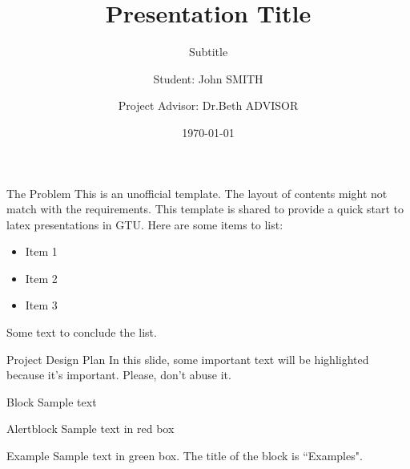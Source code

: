 \documentclass[aspectratio=169,xcolor=dvipsnames]{beamer}
\title[Title]
{
	Presentation Title
}
\subtitle{Subtitle}
\author[GTU]{Student: John SMITH  \and
	 Project Advisor: Dr.Beth ADVISOR }
\date{\today} %
\begin{document}
\begin{frame}
    \titlepage
\end{frame}





\begin{frame}{The Problem}
	This is an unofficial template. The layout of contents might not match with the requirements. This template is shared to provide a quick start to latex presentations in GTU. Here are some items to list:\\
	\vspace{0.03\textheight} %
	\begin{itemize}
		\item Item 1
		\item Item 2
		\item Item 3
	\end{itemize}
	\vspace{0.03\textheight} %
	Some text to conclude the list.
\end{frame}


\begin{frame}{Project Design Plan}
	In this slide, some important text will be \alert{highlighted} because it's important. Please, don't abuse it.
	
	\begin{block}{Block}
		Sample text
	\end{block}
	
	\begin{alertblock}{Alertblock}
		Sample text in red box
	\end{alertblock}
	
	\begin{examples}{Example}
		Sample text in green box. The title of the block is ``Examples".
	\end{examples}
\end{frame}
\end{document}
